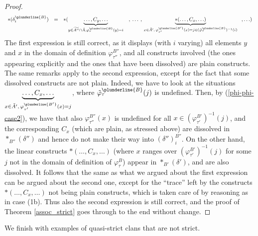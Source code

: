 \begin{proof}
$$\begin{array}{lll}
\ast(\delta_i^{\plunderline{B}}) &=& \ast(\underbrace{\ldots ,C_{y},\ldots}_{y\in \widetilde{A''}\cap \tilde{A},\varphi_{\tau}^{\plunderline{B}}(y)=i}\,\,\,\,\,\,,\:\ldots\:,\,\underbrace{\ast(\ldots ,C_x,\ldots)}_{x\in \tilde{A}',\, \varphi^{\plunderline{B'}}_{\tau'}(x)=j\in (\tilde{\varphi}_{\tau}^{\plunderline{B}})^{-1}(i)}  \,\,\,\;,\ldots)
 \end{array}$$
 The   first expression is still correct, as it displays (with $i$ varying) all elements $y$ and $x$ in the domain of definition $\varphi_{\tau''}^{B''}$, and all constructs involved (the ones appearing explicitly and the ones that have been dissolved) are plain constructs.  The same remarks apply to the second expression, except for the fact that some dissolved constructs are not plain.
 Indeed, we have to look at the  situations $\underbrace{\ldots, C_x ,\ldots}_{x\in \tilde{A}',\, \varphi^{\plunderline{B'}}_{\tau'}(x)=j}$, where 
$\tilde{\varphi}_{\tau}^{\plunderline{B}}(j)$ is undefined.  Then, by (\ref{phi-phi-case2}), we have that  also  $\varphi_{\tau''}^{B''}(x)$ is undefined for all $x\in(\varphi_{\tau'}^{B'})^{-1}(j)$, and 
the corresponding $C_x$  (which are plain, as stressed above) are dissolved  in  $\ast_{B''}(\delta'')$ and hence do not make their way into $(\delta'')^{B''}_{i}$.
On the other hand, the linear constructs  $\ast(\ldots ,C_x,\ldots)$ (where $x$ ranges over $(\varphi_{\tau'}^{B'})^{-1}(j)$ for some $j$ not in the domain of definition of $\varphi_\tau^B$) appear in  $\ast_{B'}(\delta')$, and are also dissolved. 
It follows that the same as what we argued about the first expression  can be argued about  the second one, except for 
the ``trace'' left by the constructs $\ast(\ldots ,C_x,\ldots)$ not being plain constructs, which is taken care of by  reasoning as in case (1b).
Thus also the second expression is  still correct, and the proof of Theorem \ref{assoc_strict}  goes through to the end without change.
\end{proof}
We finish with examples of quasi-strict clans that are not strict. 
